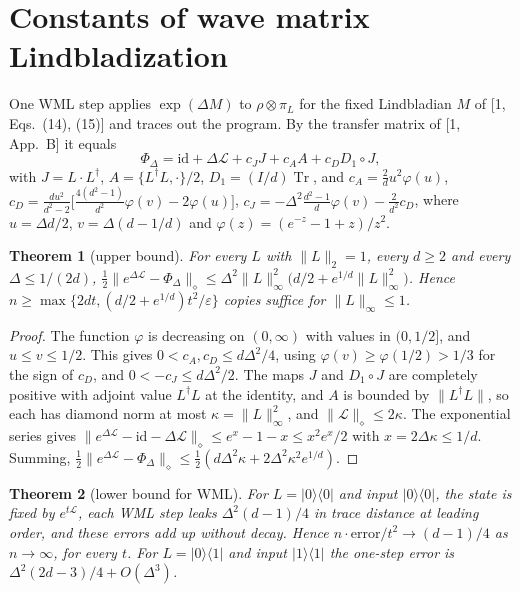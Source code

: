 \documentclass[11pt]{article}
\newtheorem{theorem}{Theorem}
\theoremstyle{remark}
\newcommand{\Lind}{\mathcal{L}}
\newcommand{\dn}[1]{\lVert #1 \rVert_\diamond}
\newcommand{\ket}[1]{\lvert #1 \rangle}
\newcommand{\bra}[1]{\langle #1 \rvert}
\newcommand{\proj}[1]{\lvert #1 \rangle\langle #1 \rvert}
\begin{document}
\section{Constants of wave matrix Lindbladization}\label{sec:wml}

One WML step applies $\exp(\Delta M)$ to $\rho\otimes\pi_L$ for the fixed Lindbladian $M$ of [1, Eqs.~(14), (15)] and traces out the program. By the transfer matrix of [1, App.~B] it equals
\[
\Phi_\Delta = \mathrm{id} + \Delta\Lind + c_J J + c_A A + c_D D_1\circ J,
\]
with $J = L\cdot L^\dagger$, $A = \{L^\dagger L, \cdot\}/2$, $D_1 = (I/d)\operatorname{Tr}$, and
$c_A = \tfrac{2}{d}u^2\varphi(u)$, $c_D = \tfrac{du^2}{d^2-2}\bigl[\tfrac{4(d^2-1)}{d^2}\varphi(v) - 2\varphi(u)\bigr]$, $c_J = -\Delta^2\tfrac{d^2-1}{d}\varphi(v) - \tfrac{2}{d^2}c_D$, where $u = \Delta d/2$, $v = \Delta(d - 1/d)$ and $\varphi(z) = (e^{-z} - 1 + z)/z^2$.

\begin{theorem}[upper bound]\label{thm:wmlupper}
For every $L$ with $\lVert L\rVert_2 = 1$, every $d \ge 2$ and every $\Delta \le 1/(2d)$,
$\tfrac12\dn{e^{\Delta\Lind} - \Phi_\Delta} \le \Delta^2\lVert L\rVert_\infty^2\bigl(d/2 + e^{1/d}\lVert L\rVert_\infty^2\bigr)$. Hence $n \ge \max\{2dt, (d/2 + e^{1/d})t^2/\varepsilon\}$ copies suffice for $\lVert L\rVert_\infty \le 1$.
\end{theorem}

\begin{proof}
The function $\varphi$ is decreasing on $(0,\infty)$ with values in $(0, 1/2]$, and $u \le v \le 1/2$. This gives $0 < c_A, c_D \le d\Delta^2/4$, using $\varphi(v) \ge \varphi(1/2) > 1/3$ for the sign of $c_D$, and $0 < -c_J \le d\Delta^2/2$. The maps $J$ and $D_1\circ J$ are completely positive with adjoint value $L^\dagger L$ at the identity, and $A$ is bounded by $\lVert L^\dagger L\rVert$, so each has diamond norm at most $\kappa = \lVert L\rVert_\infty^2$, and $\dn{\Lind} \le 2\kappa$. The exponential series gives $\dn{e^{\Delta\Lind} - \mathrm{id} - \Delta\Lind} \le e^x - 1 - x \le x^2e^x/2$ with $x = 2\Delta\kappa \le 1/d$. Summing, $\tfrac12\dn{e^{\Delta\Lind} - \Phi_\Delta} \le \tfrac12(d\Delta^2\kappa + 2\Delta^2\kappa^2 e^{1/d})$.
\end{proof}

\begin{theorem}[lower bound for WML]\label{thm:wmllower}
For $L = \proj{0}$ and input $\proj{0}$, the state is fixed by $e^{t\Lind}$, each WML step leaks $\Delta^2(d-1)/4$ in trace distance at leading order, and these errors add up without decay. Hence $n\cdot\mathrm{error}/t^2 \to (d-1)/4$ as $n\to\infty$, for every $t$. For $L = \ket{0}\bra{1}$ and input $\proj{1}$ the one-step error is $\Delta^2(2d-3)/4 + O(\Delta^3)$.
\end{theorem}
\end{document}

